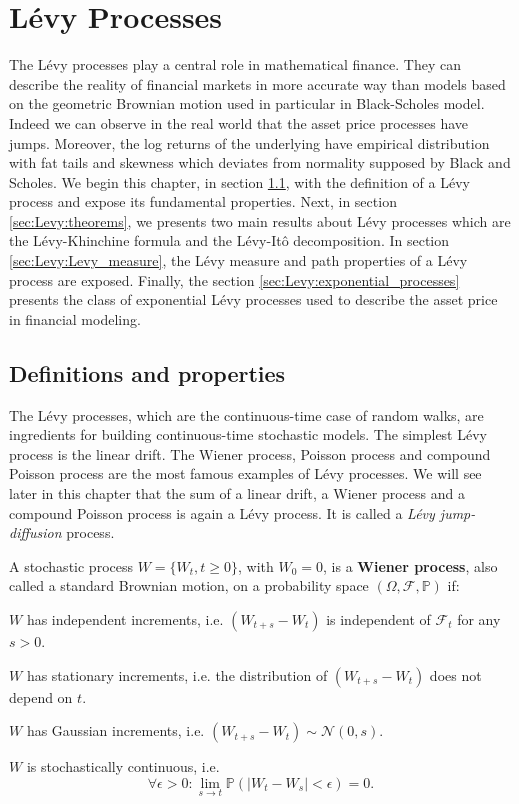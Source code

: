 \chapter{L\'evy Processes}
\label{sec:Levy}


The L\'evy processes play a central role in mathematical finance. They can describe the reality of financial markets in more accurate way than models based on the geometric Brownian motion used in particular in Black-Scholes model. Indeed we can observe in the real world that the asset price processes have jumps. Moreover, the log returns of the underlying have empirical distribution with fat tails and skewness which deviates from normality supposed by Black and Scholes. We begin this chapter, in section \ref{sec:Levy:definitions}, with the definition of a L\'evy process and expose its fundamental properties. Next, in section \ref{sec:Levy:theorems}, we presents two main results about L\'evy processes which are the L\'evy-Khinchine formula and the L\'evy-Itô decomposition. In section \ref{sec:Levy:Levy_measure}, the L\'evy measure and  path properties of a L\'evy process are exposed. Finally, the section \ref{sec:Levy:exponential_processes} presents the class of exponential L\'evy processes used to describe the asset price in financial modeling.

\section{Definitions and properties}
\label{sec:Levy:definitions}
The L\'evy processes, which are the continuous-time case of random walks, are ingredients for building continuous-time stochastic models. The simplest L\'evy process is the linear drift. The Wiener process, Poisson process and compound Poisson process are the most famous examples of L\'evy processes. We will see later in this chapter that the sum of a linear drift, a Wiener process and a compound Poisson process is again a L\'evy process. It is called a \textit{L\'evy jump-diffusion} process.

\begin{defn}\label{def:wiener}
A stochastic process $W = \{W_t,t\geq 0\}$, with $W_0=0$, is a \textbf{Wiener process}, also called a standard Brownian motion, on a probability space $(\Omega,\mathcal{F},\mathbb{P})$ if:
\begin{my_list_num}
\item $W$ has independent increments, i.e. $(W_{t+s}-W_t)$ is independent of $\mathcal{F}_t$ for any $s>0$.
\item $W$ has stationary increments, i.e. the distribution of $(W_{t+s}-W_t)$ does not depend on $t$.
\item $W$ has Gaussian increments, i.e. $(W_{t+s}-W_t) \sim \mathcal{N}(0,s)$.
\item $W$ is stochastically continuous, i.e. $$\forall \epsilon>0: \lim_{s \to t}\mathbb{P}(|W_t-W_s|<\epsilon)=0.$$
\end{my_list_num}
\end{defn}

